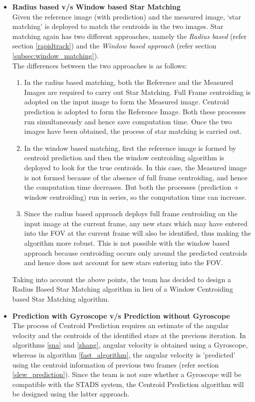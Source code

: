 \documentclass[../../main.tex]{subfiles}
\begin{document}
\begin{itemize}
    \item \textbf{Radius based v/s Window based Star Matching}\\
    Given the reference image (with prediction) and the measured image, `star matching' is deployed to match the centroids in the two images. Star matching again has two different approaches, namely the \emph{Radius based} (refer section \ref{rapidtrack}) and the \emph{Window based approach} (refer section \ref{subsec:window_matching}). \\
    The differences between the two approaches is as follows: 
    \begin{enumerate}
        \item In the radius based matching, both the Reference and the Measured Images are required to carry out Star Matching. Full Frame centroiding is adopted on the input image to form the Measured image. Centroid prediction is adopted to form the Reference Image. Both these processes run simultaneously and hence save computation time. Once the two images have been obtained, the process of star matching is carried out. 
        \item In the window based matching, first the reference image is formed by centroid prediction and then the window centroiding algorithm is deployed to look for the true centroids. In this case, the Measured image is not formed because of the absence of full frame centroiding, and hence the computation time decreases. But both the processes (prediction + window centroiding) run in series, so the computation time can increase.
        \item Since the radius based approach deploys full frame centroiding on the input image at the current frame, any new stars which may have entered into the FOV at the current frame will also be identified, thus making the algorithm more robust. This is not possible with the window based approach because centroiding occurs only around the predicted centroids and hence does not account for new stars entering into the FOV. 
    \end{enumerate}
    Taking into account the above points, the team has decided to design a Radius Based Star Matching algorithm in lieu of a Window Centroiding based Star Matching algorithm. 
    
    \item \textbf{Prediction with Gyroscope v/s Prediction without Gyroscope}\\
    The process of Centroid Prediction requires an estimate of the angular velocity and the centroids of the identified stars at the previous iteration. In algorithms \ref{sna} and \ref{zhang}, angular velocity is obtained using a Gyroscope, whereas in algorithm \ref{fast_algorithm}, the angular velocity is 'predicted' using the centroid information of previous two frames (refer section \ref{slew_prediction}). Since the team is not sure whether a Gyroscope will be compatible with the STADS system, the Centroid Prediction algorithm will be designed using the latter approach. 
\end{itemize} 
\end{document}
